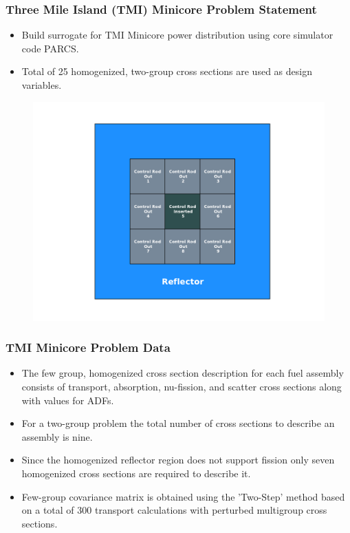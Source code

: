\documentclass{beamer}
\begin{document}
\begin{frame}
\frametitle{Three Mile Island (TMI) Minicore Problem Statement}

\begin{itemize}
  \item Build surrogate for TMI Minicore power distribution using core simulator code PARCS.
  \item Total of 25 homogenized, two-group cross sections are used as design variables.  
\end{itemize}

\begin{figure}
  \includegraphics[width=.6\textwidth]{./tmi_minicore.pdf}
\end{figure} 

\end{frame}
\begin{frame}
\frametitle{TMI Minicore Problem Data}

\begin{itemize}
  \item The few group, homogenized cross section description for each fuel assembly consists of transport, absorption, nu-fission, and scatter cross sections along with values for ADFs. 
  \item For a two-group problem the total number of cross sections to describe an assembly is nine. 
  \item Since the homogenized reflector region does not support fission only seven homogenized cross sections are required to describe it.
  \item Few-group covariance matrix is obtained using the 'Two-Step' method based on a total of 300 transport calculations with perturbed multigroup cross sections. 
\end{itemize}

\end{frame}
\end{document}
